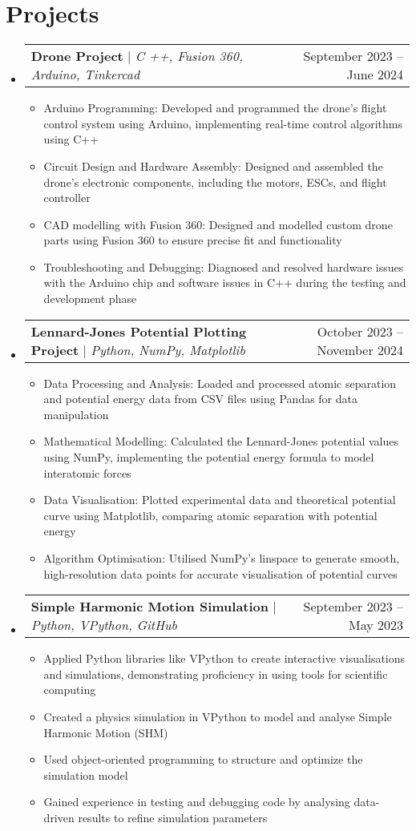 \documentclass[letterpaper,11pt]{article}
\makeatletter
\newcommand{\resumeItem}[1]{
  \item\small{
    {#1 \vspace{-2pt}}
  }
}
\newcommand{\resumeProjectHeading}[2]{
    \item
    \begin{tabular*}{0.97\textwidth}{l@{\extracolsep{\fill}}r}
      \small#1 & #2 \\
    \end{tabular*}\vspace{-7pt}
}
\newcommand{\resumeSubHeadingListStart}{\begin{itemize}[leftmargin=0.15in, label={}]}
\newcommand{\resumeSubHeadingListEnd}{\end{itemize}}
\newcommand{\resumeItemListStart}{\begin{itemize}}
\newcommand{\resumeItemListEnd}{\end{itemize}\vspace{-5pt}}
\makeatother
\begin{document}
\section{Projects}
    \resumeSubHeadingListStart
          \resumeProjectHeading
          {\textbf{Drone Project} $|$ \emph{C ++, Fusion 360, Arduino, Tinkercad}}{September 2023 -- June 2024}
          \resumeItemListStart
            \resumeItem{Arduino Programming: Developed and programmed the
drone’s flight control system using Arduino, implementing
real-time control algorithms using C++}
            \resumeItem{Circuit Design and Hardware Assembly: Designed and
assembled the drone’s electronic components, including the
motors, ESCs, and flight controller}
            \resumeItem{CAD modelling with Fusion 360: Designed and modelled custom drone parts using Fusion 360 to ensure precise fit and functionality }
            \resumeItem{Troubleshooting and Debugging: Diagnosed and resolved hardware issues with the Arduino chip and software issues in C++ during the
testing and development phase}
          \resumeItemListEnd
      \resumeProjectHeading
          {\textbf{Lennard-Jones Potential Plotting Project} $|$ \emph{Python, NumPy, Matplotlib}}{October 2023 -- November 2024}
          \resumeItemListStart
            \resumeItem{Data Processing and Analysis: Loaded and processed atomic separation and potential energy data from CSV files using Pandas for data manipulation}
            \resumeItem{Mathematical Modelling: Calculated the Lennard-Jones potential values using NumPy, implementing the potential energy formula to model interatomic forces}
            \resumeItem{Data Visualisation: Plotted experimental data and theoretical potential curve using Matplotlib, comparing atomic separation with potential energy}
            \resumeItem{Algorithm Optimisation: Utilised NumPy's linspace to generate smooth, high-resolution data points for accurate visualisation of potential curves}
          \resumeItemListEnd
      \resumeProjectHeading
          {\textbf{Simple Harmonic Motion Simulation} $|$ \emph{Python, VPython, GitHub}}{September 2023 -- May 2023}
          \resumeItemListStart
            \resumeItem{Applied Python libraries like VPython to create interactive visualisations and simulations,
demonstrating proficiency in using tools for scientific computing}
            \resumeItem{Created a physics simulation in VPython to model and analyse Simple Harmonic Motion (SHM)}
            \resumeItem{Used object-oriented programming to structure and optimize the simulation model}
            \resumeItem{Gained experience in testing and debugging code by analysing data-driven results to refine simulation parameters}
          \resumeItemListEnd
    \resumeSubHeadingListEnd
\end{document}
